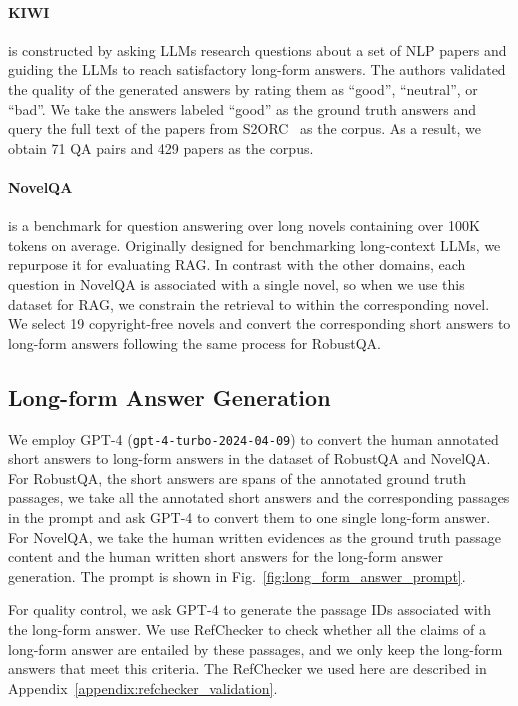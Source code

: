 \paragraph{KIWI}
is constructed by asking LLMs research questions about a set of NLP papers and guiding the LLMs to reach satisfactory long-form answers. The authors validated the quality of the generated answers by rating them as ``good'', ``neutral'', or ``bad''. We take the answers labeled ``good'' as the ground truth answers and query the full text of the papers from S2ORC~\cite{lo-etal-2020-s2orc} as the corpus. As a result, we obtain 71 QA pairs and 429 papers as the corpus.

\paragraph{NovelQA}
is a benchmark for question answering over long novels containing over 100K tokens on average. Originally designed for benchmarking long-context LLMs, we repurpose it for evaluating RAG. In contrast with the other domains, each question in NovelQA is associated with a single novel, so when we use this dataset for RAG, we constrain the retrieval to within the corresponding novel. We select 19 copyright-free novels and convert the corresponding short answers to long-form answers following the same process for RobustQA.


\subsection{Long-form Answer Generation}

We employ GPT-4 (\texttt{gpt-4-turbo-2024-04-09}) to convert the human annotated short answers to long-form answers in the dataset of RobustQA and NovelQA. For RobustQA, the short answers are spans of the annotated ground truth passages, we take all the annotated short answers and the corresponding passages in the prompt and ask GPT-4 to convert them to one single long-form answer. For NovelQA, we take the human written evidences as the ground truth passage content and the human written short answers for the long-form answer generation. The prompt is shown in Fig.~\ref{fig:long_form_answer_prompt}.

For quality control, we ask GPT-4 to generate the passage IDs associated with the long-form answer. We use RefChecker to check whether all the claims of a long-form answer are entailed by these passages, and we only keep the long-form answers that meet this criteria. The RefChecker we used here are described in Appendix~\ref{appendix:refchecker_validation}.

